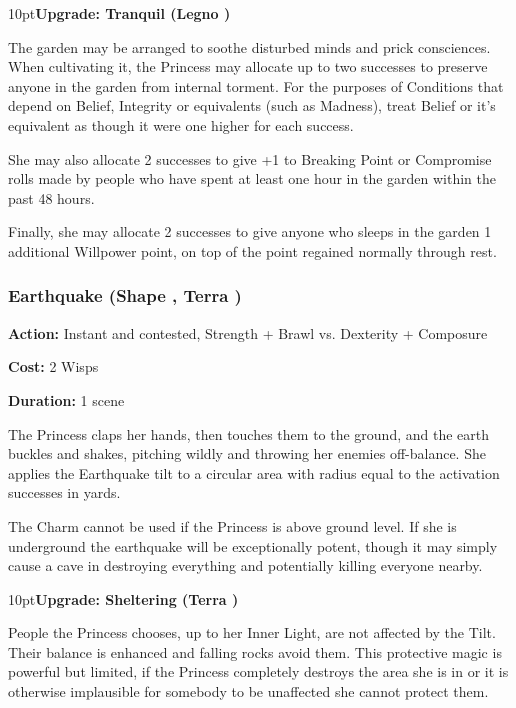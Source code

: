 \begin{myindentpar}{10pt}\textbf{Upgrade: Tranquil (Legno \textbullet\textbullet\textbullet\textbullet\textbullet)}

The garden may be arranged to soothe disturbed minds and prick consciences. When cultivating it, the Princess may allocate up to two successes to preserve anyone in the garden from internal torment. For the purposes of Conditions that depend on Belief, Integrity or equivalents (such as Madness), treat Belief or it's equivalent as though it were one higher for each success. 

She may also allocate 2 successes to give +1 to Breaking Point or Compromise rolls made by people who have spent at least one hour in the garden within the past 48 hours. 

Finally, she may allocate 2 successes to give anyone who sleeps in the garden 1 additional Willpower point, on top of the point regained normally through rest.\end{myindentpar}

\subsubsection*{Earthquake (Shape \textbullet\textbullet\textbullet\textbullet, Terra \textbullet\textbullet\textbullet)}

\noindent \textbf{Action:} Instant and contested, Strength + Brawl vs. Dexterity + Composure

\noindent \textbf{Cost:} 2 Wisps

\noindent \textbf{Duration:} 1 scene

The Princess claps her hands, then touches them to the ground, and the earth buckles and shakes, pitching wildly and throwing her enemies off-balance. She applies the Earthquake tilt to a circular area with radius equal to the activation successes in yards. 

The Charm cannot be used if the Princess is above ground level. If she is underground the earthquake will be exceptionally potent, though it may simply cause a cave in destroying everything and potentially killing everyone nearby.

\begin{myindentpar}{10pt}\textbf{Upgrade: Sheltering (Terra \textbullet\textbullet\textbullet\textbullet)}

People the Princess chooses, up to her Inner Light, are not affected by the Tilt. Their balance is enhanced and falling rocks avoid them. This protective magic is powerful but limited, if the Princess completely destroys the area she is in or it is otherwise implausible for somebody to be unaffected she cannot protect them.\end{myindentpar}

